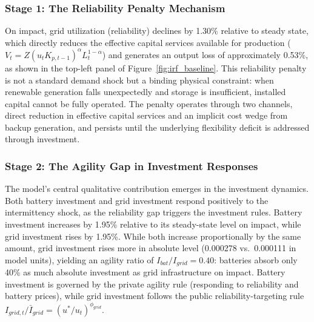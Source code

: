 	\subsubsection{Stage 1: The Reliability Penalty Mechanism}
	
	On impact, grid utilization (reliability) declines by 1.30\% relative to steady state, which directly reduces the effective capital services available for production ($V_t = Z(u_t K_{p,t-1})^\alpha L_t^{1-\alpha}$) and generates an output loss of approximately 0.53\%, as shown in the top-left panel of Figure~\ref{fig:irf_baseline}. This reliability penalty is not a standard demand shock but a binding physical constraint: when renewable generation falls unexpectedly and storage is insufficient, installed capital cannot be fully operated. The penalty operates through two channels, direct reduction in effective capital services and an implicit cost wedge from backup generation, and persists until the underlying flexibility deficit is addressed through investment.
	
	\subsubsection{Stage 2: The Agility Gap in Investment Responses}
	
	The model's central qualitative contribution emerges in the investment dynamics. Both battery investment and grid investment respond positively to the intermittency shock, as the reliability gap triggers the investment rules. Battery investment increases by 1.95\% relative to its steady-state level on impact, while grid investment rises by 1.95\%. While both increase proportionally by the same amount, grid investment rises more in absolute level (0.000278 vs.\ 0.000111 in model units), yielding an agility ratio of $I_{bat}/I_{grid} = 0.40$: batteries absorb only 40\% as much absolute investment as grid infrastructure on impact. Battery investment is governed by the private agility rule (responding to reliability and battery prices), while grid investment follows the public reliability-targeting rule $I_{grid,t}/\bar{I}_{grid} = (u^*/u_t)^{\phi_{grid}}$.
	
